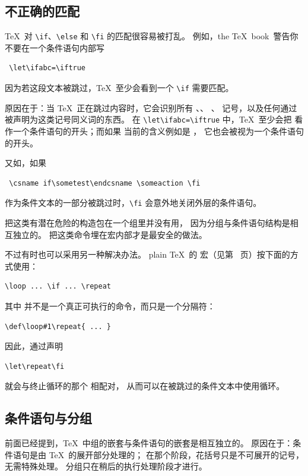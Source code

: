 \documentclass[a4paper]{rapport3}
\def\TeXbook{the \TeX\ book}\def\web{{\sc web}}
\begin{document}
\subsection{不正确的匹配}

\TeX\ 对 \verb.\if.、\verb.\else. 和 \verb.\fi. 的匹配很容易被打乱。
例如，\TeXbook\ 警告你不要在一个条件语句内部写 \begin{verbatim}
 \let\ifabc=\iftrue
\end{verbatim}
因为若这段文本被跳过，\TeX\ 至少会看到一个 \verb.\if. 需要匹配。 

原因在于：当 \TeX\ 正在跳过内容时，它会识别所有 、、
、 记号，以及任何通过  被声明为这类记号同义词的东西。
在 \verb>\let\ifabc=\iftrue> 中，\TeX\ 至少会把 
看作一个条件语句的开头；而如果  当前的含义例如是 ，
它也会被视为一个条件语句的开头。

又如，如果
\begin{verbatim}
 \csname if\sometest\endcsname \someaction \fi
\end{verbatim}
作为条件文本的一部分被跳过时，\verb.\fi. 会意外地关闭外层的条件语句。

把这类有潜在危险的构造包在一个组里并没有用，
因为分组与条件语句结构是相互独立的。
把这类命令埋在宏内部才是最安全的做法。

不过有时也可以采用另一种解决办法。
plain \TeX\ 的  宏（见第~\pageref{loop:ex} 页）按下面的方式使用： \begin{verbatim}
\loop ... \if ... \repeat
\end{verbatim}
其中  并不是一个真正可执行的命令，而只是一个分隔符：
\begin{verbatim}
\def\loop#1\repeat{ ... }
\end{verbatim}
因此，通过声明 \begin{verbatim}
\let\repeat\fi
\end{verbatim}
 就会与终止循环的那个  相配对，
从而可以在被跳过的条件文本中使用循环。

\subsection{条件语句与分组}

前面已经提到，\TeX\ 中组的嵌套与条件语句的嵌套是相互独立的。
原因在于：条件语句是由 \TeX\ 的展开部分处理的；
在那个阶段，花括号只是不可展开的记号，无需特殊处理。
分组只在稍后的执行处理阶段才进行。
\end{document}
